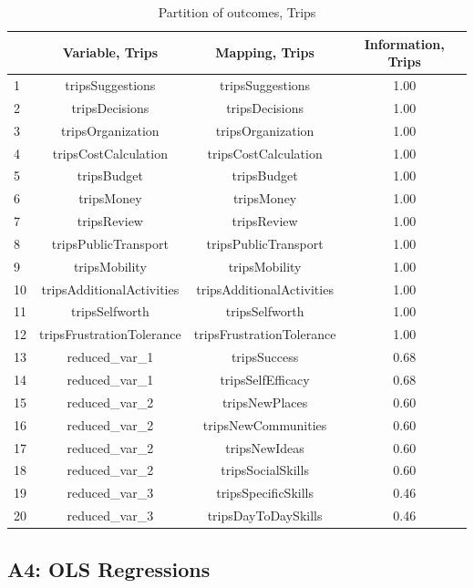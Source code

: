 \documentclass[12pt, a4paper, titlepage]{article}\usepackage[]{graphicx}\usepackage[]{color}
\begin{document}
\begin{table}[ht]
\centering
\begin{tabular}{lccc}
  \hline
 & Variable, Trips & Mapping, Trips & Information, Trips \\ 
  \hline
1 & tripsSuggestions & tripsSuggestions & 1.00 \\ 
  2 & tripsDecisions & tripsDecisions & 1.00 \\ 
  3 & tripsOrganization & tripsOrganization & 1.00 \\ 
  4 & tripsCostCalculation & tripsCostCalculation & 1.00 \\ 
  5 & tripsBudget & tripsBudget & 1.00 \\ 
  6 & tripsMoney & tripsMoney & 1.00 \\ 
  7 & tripsReview & tripsReview & 1.00 \\ 
  8 & tripsPublicTransport & tripsPublicTransport & 1.00 \\ 
  9 & tripsMobility & tripsMobility & 1.00 \\ 
  10 & tripsAdditionalActivities & tripsAdditionalActivities & 1.00 \\ 
  11 & tripsSelfworth & tripsSelfworth & 1.00 \\ 
  12 & tripsFrustrationTolerance & tripsFrustrationTolerance & 1.00 \\ 
  13 & reduced\_var\_1 & tripsSuccess & 0.68 \\ 
  14 & reduced\_var\_1 & tripsSelfEfficacy & 0.68 \\ 
  15 & reduced\_var\_2 & tripsNewPlaces & 0.60 \\ 
  16 & reduced\_var\_2 & tripsNewCommunities & 0.60 \\ 
  17 & reduced\_var\_2 & tripsNewIdeas & 0.60 \\ 
  18 & reduced\_var\_2 & tripsSocialSkills & 0.60 \\ 
  19 & reduced\_var\_3 & tripsSpecificSkills & 0.46 \\ 
  20 & reduced\_var\_3 & tripsDayToDaySkills & 0.46 \\ 
   \hline
\end{tabular}
\caption{Partition of outcomes, Trips} 
\label{partitiontrips}
\end{table}


\subsection{A4: OLS Regressions}
\end{document}
